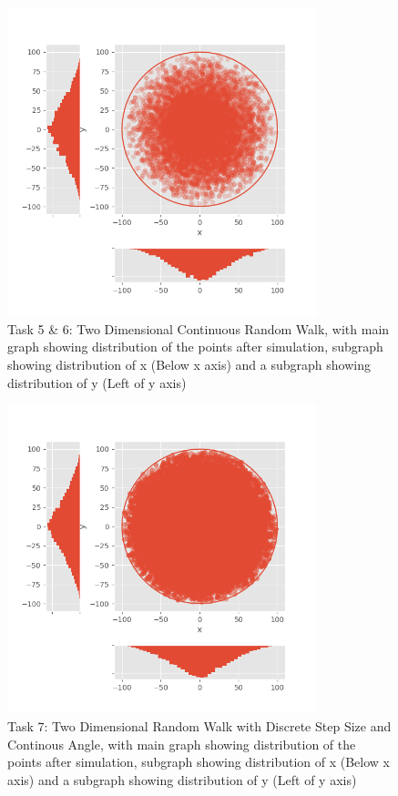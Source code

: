 \documentclass[a4paper, 11pt]{book} %
\begin{document}
\begin{figure}[h]
	\centering
	\includegraphics[width=0.8\textwidth]{Task5.png}
	\caption{Task 5 \& 6: Two Dimensional Continuous Random Walk, with main graph showing distribution of the points after simulation, subgraph showing distribution of x (Below x axis) and a subgraph showing distribution of y (Left of y axis)}
	\label{fig:task5}
\end{figure}

\begin{figure}[h]
	\centering
	\includegraphics[width=0.8\textwidth]{Task7.png}
	\caption{Task 7: Two Dimensional Random Walk with Discrete Step Size and Continous Angle, with main graph showing distribution of the points after simulation, subgraph showing distribution of x (Below x axis) and a subgraph showing distribution of y (Left of y axis)}
	\label{fig:task7}
\end{figure}
\end{document}
